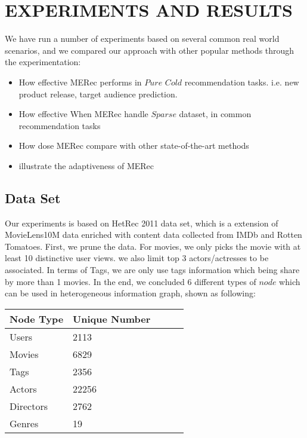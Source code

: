 \section{EXPERIMENTS AND RESULTS}\label{4_experiment}
We have run a number of experiments based on several common real world scenarios, and we compared our approach with other popular methods through the experimentation:
\begin{itemize}
    \item How effective MERec performs in $Pure$ $Cold$ recommendation tasks. i.e. new product release, target audience prediction.
    \item How effective When MERec handle $Sparse$ dataset, in common recommendation tasks
    \item How dose MERec compare with other state-of-the-art methods
    \item illustrate the adaptiveness of MERec 
\end{itemize}

\subsection{Data Set}
Our experiments is based on HetRec 2011 \cite{CantadorRecSys2011} data set, which is a extension of MovieLens10M data enriched with content data collected from IMDb and Rotten Tomatoes.
First, we prune the data. For movies, we only picks the movie with at least 10 distinctive user views. we also limit top 3 actors/actresses to be associated. In terms of Tags, we are only use tags information which being share by more than 1 movies. In the end, we concluded 6 different types of $node$ which can be used in heterogeneous information graph, shown as following:
\begin{center}
    \begin{tabular}{|l|l|l|l|l|}
    \hline
     \textbf{Node Type} & \textbf{Unique Number} \\ \hline
     Users &  2113\\ \hline
     Movies &   6829 \\ \hline
     Tags &  2356 \\ \hline
     Actors &  22256 \\ \hline
     Directors &  2762 \\ \hline
     Genres &  19 \\ \hline
    \end{tabular}
\end{center}

